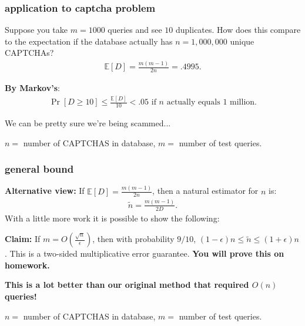 \documentclass[]{beamer}
\newcommand{\E}{\mathbb{E}}
\begin{document}
	\begin{frame}
		\frametitle{application to captcha problem}
		Suppose you take $m = 1000$ queries and see $10$ duplicates. How does this compare to the expectation if the database actually has $n = 1,000,000$ unique CAPTCHAs?
		\begin{align*}
			\E[D] = \frac{m(m-1)}{2n} = .4995.
		\end{align*}
		
		\textbf{By Markov's}:
		\begin{align*}
			\Pr[D \geq 10] \leq \frac{\E[D]}{10} < .05 \text{ if $n$ actually equals $1$ million}. 
		\end{align*}
		
		We can be pretty sure we're being scammed...
		
		\vspace{1em}
		\begin{block}{\vspace*{-3ex}}
			\small $n = $ number of CAPTCHAS in database, $m=$ number of test queries.
		\end{block}
	\end{frame}
	
	\begin{frame}
		\frametitle{general bound}
		\textbf{Alternative view:} If $\E[D] = \frac{m(m-1)}{2n}$, then a natural estimator for $n$ is:
		\begin{align*}
			\tilde{n} = \frac{m(m-1)}{2D}.
		\end{align*}
		With a little more work it is possible to show the following: 
		
		\textbf{Claim:} If $m = O\left(\frac{\sqrt{n}}{\epsilon}\right)$, then with probability $9/10$, $(1-\epsilon)n \leq \tilde n \leq (1+\epsilon) n$. This is a two-sided \alert{multiplicative} error guarantee. \textbf{You will prove this on homework.}
		
		\begin{center}
			\textbf{\alert{This is a lot better than our original method that required $O(n)$ queries!}}
		\end{center}
		
		\vspace{6em}
		\begin{block}{\vspace*{-3ex}}
			\small $n = $ number of CAPTCHAS in database, $m=$ number of test queries.
		\end{block}
	\end{frame}
	
\end{document}
